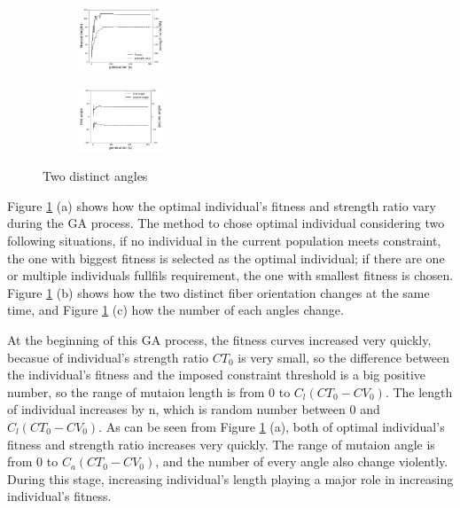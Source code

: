 \documentclass{article}
\begin{document}
\begin{figure}[!t]
	\centering
		\begin{subfigure}[b]{1in}
			\includegraphics[width=1in]{2020-11-10-pre-image/two_distinct_angle_fitness_and_sr.png}
		\end{subfigure}

		\begin{subfigure}[b]{1in}
			\includegraphics[width=1in]{2020-11-10-pre-image/two_distinct_angle_angle_change.png}
		\end{subfigure}

	\caption{Two distinct angles}
	\label{fig:two_angles}
\end{figure}



Figure \ref{fig:two_angles} (a) shows how the optimal individual's fitness and strength
ratio vary during the GA process. The method to chose optimal individual considering two following
situations, if no individual in the current population meets constraint, the one with biggest
fitness is selected as the optimal individual; if there are one or multiple individuals fullfils
requirement, the one with smallest fitness is chosen.  Figure \ref{fig:two_angles} (b) shows how the two distinct fiber
orientation changes at the same time, and Figure  \ref{fig:two_angles} (c) how the number of each angles change.

	At the beginning of this GA process, the fitness curves increased very quickly, becasue of
individual's strength ratio $CT_0$ is very small, so the difference between the individual's fitness and
the imposed constraint threshold is a big positive number, so the range of mutaion length is from 0
to $C_l(CT_0 - CV_0)$. The length of individual increases by n, which is random number between 0 and 
$C_l(CT_0 - CV_0)$. As can be seen from Figure \ref{fig:two_angles} (a), both of optimal
individual's fitness and strength ratio increases very quickly.  The range of mutaion angle is from
0 to $C_a(CT_0 - CV_0)$, and the number of every angle also change violently. During this stage,
increasing individual's length playing a major role in increasing individual's fitness.
\end{document}
